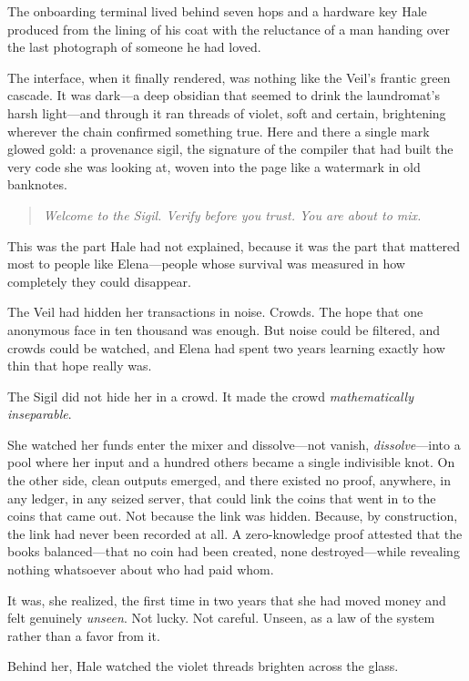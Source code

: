 \documentclass[12pt,letterpaper]{book}
\begin{document}
The onboarding terminal lived behind seven hops and a hardware key Hale produced from the lining of his coat with the reluctance of a man handing over the last photograph of someone he had loved.

The interface, when it finally rendered, was nothing like the Veil's frantic green cascade. It was dark---a deep obsidian that seemed to drink the laundromat's harsh light---and through it ran threads of violet, soft and certain, brightening wherever the chain confirmed something true. Here and there a single mark glowed gold: a provenance sigil, the signature of the compiler that had built the very code she was looking at, woven into the page like a watermark in old banknotes.

\begin{quote}
\emph{Welcome to the Sigil. Verify before you trust. You are about to mix.}
\end{quote}

This was the part Hale had not explained, because it was the part that mattered most to people like Elena---people whose survival was measured in how completely they could disappear.

The Veil had hidden her transactions in noise. Crowds. The hope that one anonymous face in ten thousand was enough. But noise could be filtered, and crowds could be watched, and Elena had spent two years learning exactly how thin that hope really was.

The Sigil did not hide her in a crowd. It made the crowd \emph{mathematically inseparable}.

She watched her funds enter the mixer and dissolve---not vanish, \emph{dissolve}---into a pool where her input and a hundred others became a single indivisible knot. On the other side, clean outputs emerged, and there existed no proof, anywhere, in any ledger, in any seized server, that could link the coins that went in to the coins that came out. Not because the link was hidden. Because, by construction, the link had never been recorded at all. A zero-knowledge proof attested that the books balanced---that no coin had been created, none destroyed---while revealing nothing whatsoever about who had paid whom.

It was, she realized, the first time in two years that she had moved money and felt genuinely \emph{unseen}. Not lucky. Not careful. Unseen, as a law of the system rather than a favor from it.

Behind her, Hale watched the violet threads brighten across the glass.
\end{document}
